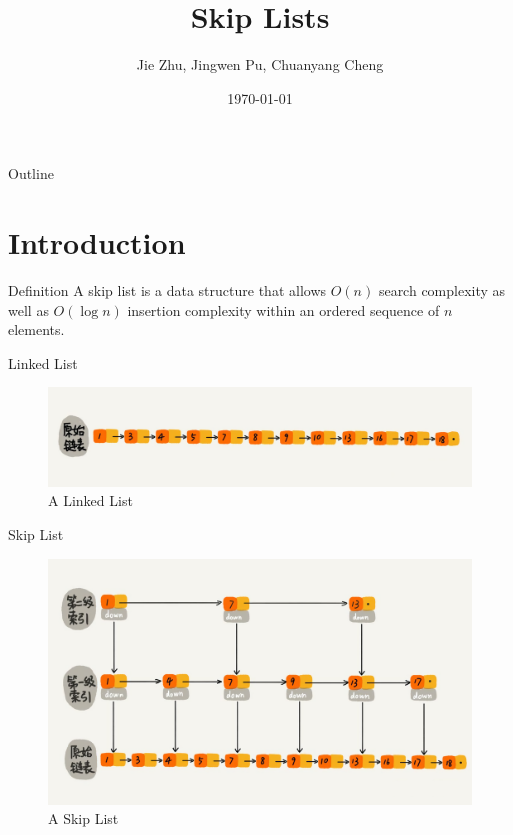\documentclass[12pt]{beamer}
\title{Skip Lists}
\date{\today}
\author{Jie Zhu, Jingwen Pu, Chuanyang Cheng}
\institute{Chollege of Computer and Technology, Zhejiang University}
\begin{document}
\maketitle

\begin{frame}{Outline}
	\tableofcontents
\end{frame}
\section{Introduction} 
\begin{frame}{Definition}
A skip list is a data structure that allows $O(n)$ search complexity as well as $O(\log n)$ insertion complexity within an ordered sequence of $n$ elements. \cite{pugh1990skip}
\end{frame}
\begin{frame}{Linked List}
\vspace{1.5cm}
	\begin{figure}
		\centering
		\includegraphics[scale=0.25]{Figures/原始链表}
		\caption{A Linked List}
	\end{figure}
\end{frame}

\begin{frame}{Skip List}
\vspace{0.4cm}
	\begin{figure}
		\centering
		\includegraphics[scale=0.25]{Figures/跳表}
		\caption{A Skip List}
	\end{figure}
\end{frame}
\end{document}
